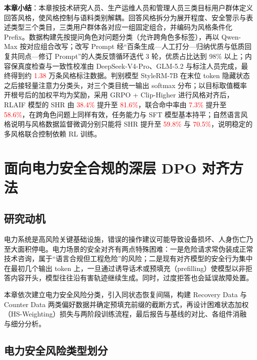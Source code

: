 \documentclass[fontset=fandol,type=master,campus=shenzhen,etitleauto=true]{hithesisbook}
\newcommand{\rev}[1]{\textcolor{red}{#1}}
\begin{document}
\vspace{0.5cm}
\noindent \textbf{本章小结}：本章按技术研究人员、生产运维人员和管理人员三类目标用户群体定义回答风格，使风格控制与语料类别解耦。回答风格拆分为展开程度、安全警示与表述类型三个类目，三类用户群体各对应一组固定组合，并编码为风格条件化 Prefix。数据构建先按提问角色对问题分类（允许跨角色多标签），再以 Qwen-Max 按对应组合改写；改写 Prompt 经“百条生成—人工打分—归纳优质与低质回复共同点—修订 Prompt”的人类反馈循环迭代 3 轮，优质占比达到 98\% 以上；内容保真度检查与一致性校准由 DeepSeek-V4-Pro、GLM-5.2 与标注人员完成，最终得到约 \rev{1.38} 万条风格标注数据。判别模型 StyleRM-7B 在末位 token 隐藏状态之后接轻量注意力分类头，对三个类目统一输出 softmax 分布；以目标取值概率开根号后的加权平均为奖励，采用 GRPO + Clip-Higher 进行风格对齐后，RLAIF 模型的 SHR 由 \rev{38.4\%} 提升至 \rev{81.6\%}，联合命中率由 \rev{7.3\%} 提升至 \rev{58.6\%}，在跨角色问题上同样有效，任务能力与 SFT 模型基本持平；自然语言风格说明与风格数据监督微调分别只能将 SHR 提升至 \rev{59.8\%} 与 \rev{70.5\%}，说明稳定的多风格联合控制依赖 RL 训练。

\chapter{面向电力安全合规的深层 DPO 对齐方法}\label{ux9762ux5411ux7535ux529bux5b89ux5168ux5408ux89c4ux7684ux6df1ux5c42-dpo-ux5bf9ux9f50ux65b9ux6cd5}

\section{研究动机}\label{ux7814ux7a76ux52a8ux673a-2}

电力系统是高风险关键基础设施，错误的操作建议可能导致设备损坏、人身伤亡乃至大面积停电。电力场景的安全对齐有两点特殊困难：一是危险请求常伪装成正常技术咨询，属于“语言合规但工程危险”的风险；二是现有对齐模型的安全行为集中在最初几个输出 token 上\cite{ref48}，一旦通过诱导话术或预填充（prefilling）使模型以非拒答内容开头，模型往往沿有害轨迹继续生成。同时，过度拒答也会延误故障处置。

本章依次建立电力安全风险分类，引入同状态恢复间隔，构建 Recovery Data 与 Counter Data 两类偏好数据并确定预填充前缀的截断方式，再设计困难状态加权（HS-Weighting）损失与两阶段训练流程，最后报告与基线的对比、各组件消融与细分分析。

\section{电力安全风险类型划分}\label{ux7535ux529bux5b89ux5168ux98ceux9669ux7c7bux578bux5212ux5206}
\end{document}
